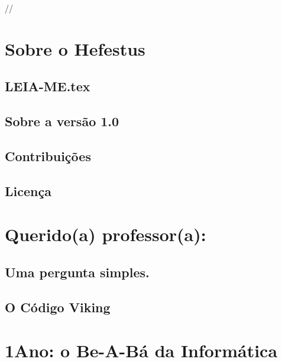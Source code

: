 \color{black}

//	\chapter{\sffamily Sobre o Hefestus}
	
\section{\sffamily LEIA-ME.tex}



\section{\sffamily Sobre a vers\~{a}o 1.0}


\section{\sffamily Contribui\c{c}\~{o}es}


\section{\sffamily Licen\c{c}a}


		\chapter{\sffamily Querido(a) professor(a):}

%		




\section{\sffamily Uma pergunta simples.}



\section{\sffamily O C\'{o}digo Viking}

	
\chapter[ 1\textordmasculine\space Ano: o Be-A-B\'{a} da Inform\'{a}tica]{1\textordmasculine\space Ano: o Be-A-B\'{a} da Inform\'{a}tica}\label{chap3}


